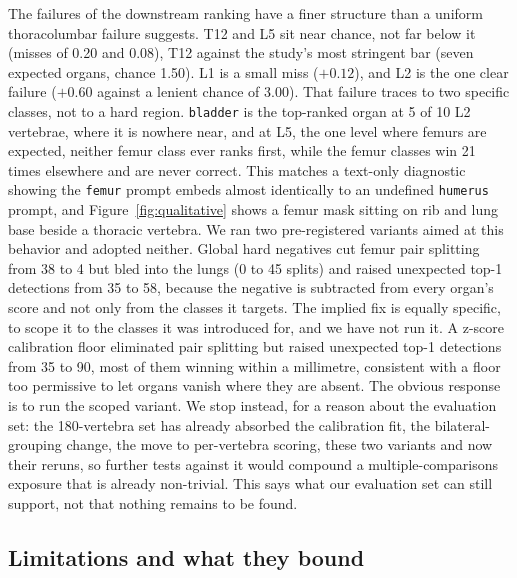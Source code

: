 \documentclass[10pt]{article}
\newcommand{\org}[1]{\texttt{#1}}
\begin{document}
The failures of the downstream ranking have a finer structure than a uniform
thoracolumbar failure suggests. T12 and L5 sit near chance, not far below
it (misses of 0.20 and 0.08), T12 against the study's most stringent bar (seven
expected organs, chance 1.50). L1 is a small miss ($+0.12$), and L2 is the one
clear failure ($+0.60$ against a lenient chance of 3.00). That failure traces to
two specific classes, not to a hard region. \org{bladder} is the top-ranked
organ at 5 of 10 L2 vertebrae, where it is nowhere near, and at L5, the one level
where femurs are expected, neither femur class ever ranks first, while the femur
classes win 21 times elsewhere and are never correct. This matches a text-only
diagnostic showing the \org{femur} prompt embeds almost identically to an
undefined \org{humerus} prompt, and Figure~\ref{fig:qualitative} shows a femur
mask sitting on rib and lung base beside a thoracic vertebra. We ran two
pre-registered variants aimed at this behavior and adopted neither. Global hard
negatives cut femur pair splitting from 38 to 4 but bled into the lungs (0 to 45
splits) and raised unexpected top-1 detections from 35 to 58, because the negative
is subtracted from every organ's score and not only from the classes it targets.
The implied fix is equally specific, to scope it to the classes it was introduced
for, and we have not run it. A z-score calibration floor eliminated pair splitting
but raised unexpected top-1 detections from 35 to 90, most of them winning within
a millimetre, consistent with a floor too permissive to let organs vanish where
they are absent. The obvious response is to run the scoped variant. We stop
instead, for a reason about the evaluation set: the 180-vertebra set has already
absorbed the calibration fit, the bilateral-grouping change, the move to
per-vertebra scoring, these two variants and now their reruns, so further tests
against it would compound a multiple-comparisons exposure that is already
non-trivial. This says what our evaluation set can still support, not that
nothing remains to be found.

\subsection{Limitations and what they bound}
\end{document}
